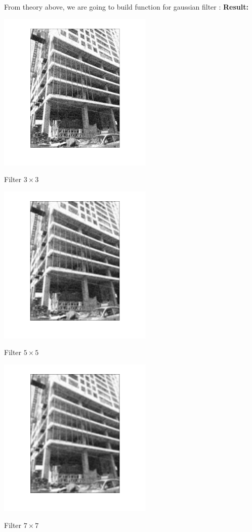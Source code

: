 From theory above, we are going to build function for gaussian filter :
\newpage
\textbf{Result:}

\begin{center}
	\includegraphics{gauc3.png}
	
	Filter $3\times3$
	
	\includegraphics{gauc5.png}
	
	Filter $5\times5$
	
	\includegraphics{gauc7.png}
	
	Filter $7\times7$
\end{center}

